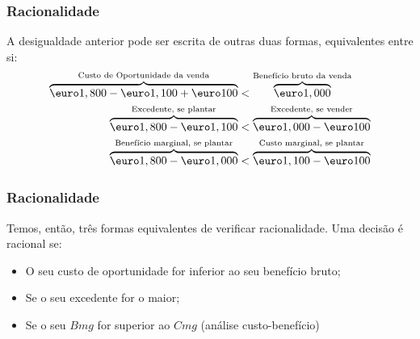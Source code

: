 \begin{frame}
	\frametitle{Racionalidade}
	A desigualdade anterior pode ser escrita de outras duas formas, {\color{blue}equivalentes entre si}:
	\begin{align}
		\overbrace{\textup{\euro} 1,800 - \textup{\euro} 1,100 + \textup{\euro} 100}^{\text{Custo de Oportunidade da venda}} &< \overbrace{\textup{\euro} 1,000}^{\text{Benef\'icio bruto da venda}} \\ 
		\overbrace{\textup{\euro} 1,800 - \textup{\euro} 1,100}^{\text{Excedente, se plantar}} &< \overbrace{\textup{\euro} 1,000 - \textup{\euro} 100}^{\text{Excedente, se vender}} \\ 
		\overbrace{\textup{\euro} 1,800 - \textup{\euro} 1,000}^{\text{Benef\'icio marginal, se plantar}} &< \overbrace{\textup{\euro} 1,100 - \textup{\euro} 100}^{\text{Custo marginal, se plantar}} 
	\end{align}
\end{frame}

\begin{frame}
	\frametitle{Racionalidade}
	Temos, ent\~ao, tr\^es formas equivalentes de verificar racionalidade. Uma decis\~ao \'e racional se:
	\begin{itemize}
		\item O seu custo de oportunidade for inferior ao seu benef\'icio bruto;
		\item Se o seu excedente for o maior;
		\item Se o seu $Bmg$ for superior ao $Cmg$ (an\'alise custo-benef\'icio)
	\end{itemize}
\end{frame}